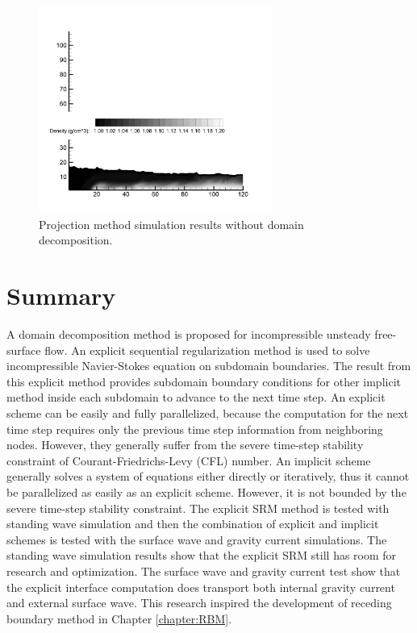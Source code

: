 \begin{figure}[h]
\begin{center}
\includegraphics[width=3.0in]{../figures/SRM/contour.pdf}
\end{center}
    \caption{Projection method simulation results without domain decomposition.}
    \label{fig:Wave-GravityCurrent-Proj}
\end{figure}

\cp

\section{Summary}
A domain decomposition method is proposed for incompressible unsteady free-surface flow. An explicit sequential regularization method is used to solve incompressible Navier-Stokes equation on subdomain boundaries. The result from this explicit method provides subdomain boundary conditions for other implicit method inside each subdomain to advance to the next time step. An explicit scheme can be easily and fully parallelized, because the computation for the next time step requires only the previous time step information from neighboring nodes. However, they generally suffer from the severe time-step stability constraint of Courant-Friedrichs-Levy (CFL) number. An implicit scheme generally solves a system of equations either directly or iteratively, thus it cannot be parallelized as easily as an explicit scheme. However, it is not bounded by the severe time-step stability constraint. The explicit SRM method is tested with standing wave simulation and then the combination of explicit and implicit schemes is tested with the surface wave and gravity current simulations. The standing wave simulation results show that the explicit SRM still has room for research and optimization. The surface wave and gravity current test show that the explicit interface computation does transport both internal gravity current and external surface wave. This research inspired the development of receding boundary method in Chapter \ref{chapter:RBM}.



